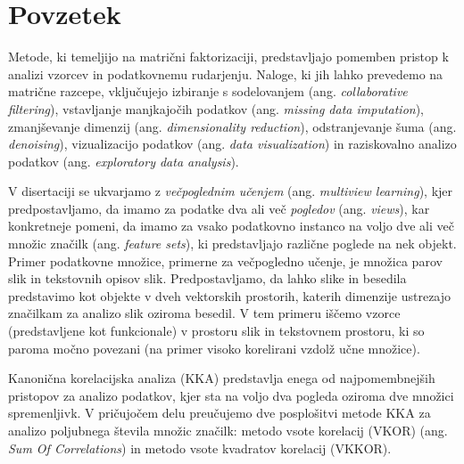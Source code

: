 %
\chapter*{Povzetek}

Metode, ki temeljijo na matrični faktorizaciji, predstavljajo pomemben pristop k analizi vzorcev
in podatkovnemu rudarjenju. Naloge, ki jih lahko prevedemo na matrične razcepe, vključujejo izbiranje
s sodelovanjem (ang. \emph{collaborative filtering}), vstavljanje manjkajočih podatkov (ang. \emph{missing data imputation}),
zmanjševanje dimenzij (ang. \emph{dimensionality reduction}), odstranjevanje šuma (ang. \emph{denoising}), vizualizacijo
podatkov (ang. \emph{data visualization}) in raziskovalno analizo podatkov (ang. \emph{exploratory data analysis}).

V disertaciji se ukvarjamo z \emph{večpoglednim učenjem} (ang. \emph{multiview learning}), kjer
predpostavljamo, da imamo za podatke dva ali več \emph{pogledov} (ang. \emph{views}), kar konkretneje
pomeni, da imamo za vsako podatkovno instanco na voljo dve ali več množic značilk (ang. \emph{feature sets}),
ki predstavljajo različne poglede na nek objekt. Primer podatkovne množice, primerne za večpogledno učenje,
je množica parov slik in tekstovnih opisov slik. Predpostavljamo, da lahko slike in besedila
predstavimo kot objekte v dveh vektorskih prostorih, katerih dimenzije ustrezajo značilkam za analizo
slik oziroma besedil. V tem primeru iščemo vzorce (predstavljene kot funkcionale) v prostoru slik
in tekstovnem prostoru, ki so paroma močno povezani (na primer visoko korelirani vzdolž učne množice).

Kanonična korelacijska analiza (KKA) predstavlja enega od najpomembnejših pristopov za analizo
podatkov, kjer sta na voljo dva pogleda oziroma dve množici spremenljivk. V pričujočem delu
preučujemo dve posplošitvi metode KKA za analizo poljubnega števila množic značilk: metodo
vsote korelacij (VKOR) (ang. \emph{Sum Of Correlations}) in metodo vsote kvadratov korelacij (VKKOR).

